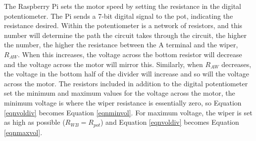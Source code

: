 \documentclass[twoside,a4]{report}
\begin{document}
	The Raspberry Pi sets the motor speed by setting the resistance in the digital potentiometer. The Pi sends a 7-bit digital signal to the pot, indicating the resistance desired. Within the potentiometer is a network of resistors, and this number will determine the path the circuit takes through the circuit, the higher the number, the higher the resistance between the A terminal and the wiper, \(R_{AW}\). When this increases, the voltage across the bottom resistor will decrease and the voltage across the motor will mirror this. Similarly, when \(R_{AW}\) decreases, the voltage in the bottom half of the divider will increase and so will the voltage across the motor. The resistors included in addition to the digital potentiometer set the minimum and maximum values for the voltage across the motor, the minimum voltage is where the wiper resistance is essentially zero, so Equation \ref{eqnvoldiv} becomes Equation \ref{eqnminvol}. For maximum voltage, the wiper is set as high as possible (\(R_{WB} = R_{pot}\)) and Equation \ref{eqnvoldiv} becomes Equation \ref{eqnmaxvol}. 
\end{document}
